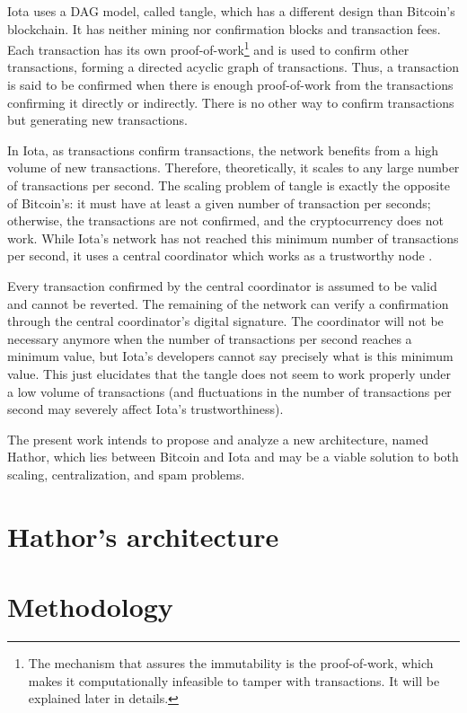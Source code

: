 Iota uses a DAG model, called tangle, which has a different design than Bitcoin's blockchain. It has neither mining nor confirmation blocks and transaction fees. Each transaction has its own proof-of-work\footnote{The mechanism that assures the immutability is the proof-of-work, which makes it computationally infeasible to tamper with transactions. It will be explained later in details.} and is used to confirm other transactions, forming a directed acyclic graph of transactions. Thus, a transaction is said to be confirmed when there is enough proof-of-work from the transactions confirming it directly or indirectly. There is no other way to confirm transactions but generating new transactions.

In Iota, as transactions confirm transactions, the network benefits from a high volume of new transactions. Therefore, theoretically, it scales to any large number of transactions per second. The scaling problem of tangle is exactly the opposite of Bitcoin's: it must have at least a given number of transaction per seconds; otherwise, the transactions are not confirmed, and the cryptocurrency does not work. While Iota's network has not reached this minimum number of transactions per second, it uses a central coordinator which works as a trustworthy node \citep{iotacoordinator}.

Every transaction confirmed by the central coordinator is assumed to be valid and cannot be reverted. The remaining of the network can verify a confirmation through the central coordinator's digital signature. The coordinator will not be necessary anymore when the number of transactions per second reaches a minimum value, but Iota's developers cannot say precisely what is this minimum value. This just elucidates that the tangle does not seem to work properly under a low volume of transactions (and fluctuations in the number of transactions per second may severely affect Iota's trustworthiness).

The present work intends to propose and analyze a new architecture, named Hathor, which lies between Bitcoin and Iota and may be a viable solution to both scaling, centralization, and spam problems.




\section{Hathor's architecture}



\section{Methodology}

